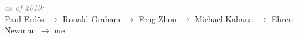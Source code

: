 \documentclass[10pt]{cooperCV2}
\begin{document}
\textit{\textcolor{grey}{as of 2019:}}\\
Paul Erdös $\rightarrow$ Ronald Graham $\rightarrow$ Feng Zhou $\rightarrow$ Michael Kahana $\rightarrow$ Ehren Newman $\rightarrow$ me\\








%	













\end{document}
